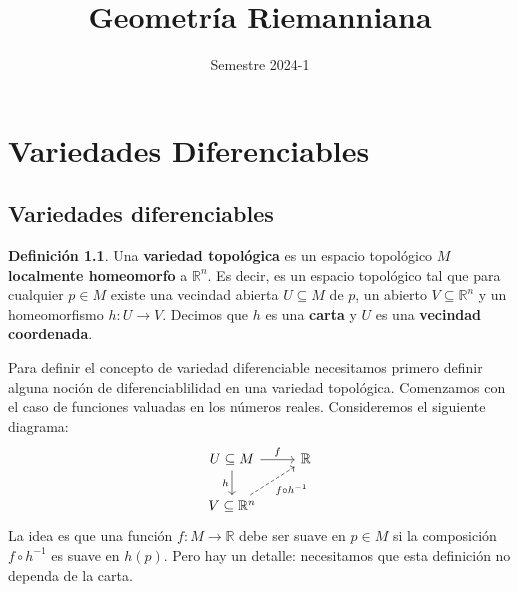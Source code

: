 \documentclass[spanish]{book}
\title{Geometría Riemanniana}
\author{Semestre 2024-1}
\renewcommand{\contentsname}{Índice}
\theoremstyle{definition}
\newtheorem*{defn}{Definición}
\newcommand{\R}{\mathbb{R}}
\begin{document}
	\maketitle
	\addcontentsline{toc}{part}{\contentsname}
	\tableofcontents
	
	\chapter{Variedades Diferenciables}
	\section{Variedades diferenciables}
	\begin{defn}
		Una \textbf{variedad topológica} es un espacio topológico $M$ \textbf{localmente homeomorfo} a $\R^n$. Es decir, es un espacio topológico tal que para cualquier $p\in M$ existe una vecindad abierta $U\subseteq M$ de $p$, un abierto $V\subseteq\R^n$ y un  homeomorfismo $h:U\to V$. Decimos que $h$ es una \textbf{carta} y $U$ es una \textbf{vecindad coordenada}.
	\end{defn}
	Para definir el concepto de variedad diferenciable necesitamos primero definir alguna noción de diferenciablilidad en una variedad topológica. Comenzamos con el caso de funciones valuadas en los números reales. Consideremos el siguiente diagrama:
	\[\begin{tikzcd}
		U\subseteq M\arrow{r}{f} \arrow{d}[swap]{h} & \mathbb{R} \\
		V \subseteq \mathbb{R}^n \arrow[swap,dashed]{ur}{f \circ h^{-1}} 
	\end{tikzcd}\]
	La idea es que una función $f:M\to\R$ debe ser suave en $p\in M$ si la composición $f\circ h^{-1}$ es suave en $h(p)$. Pero hay un detalle: necesitamos que esta definición no dependa de la carta.
	
\end{document}
